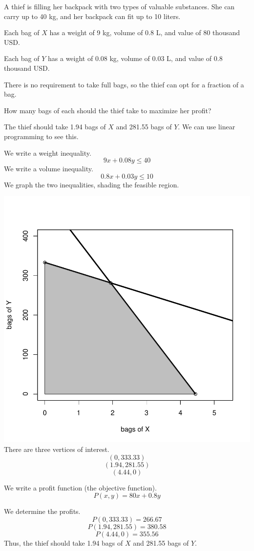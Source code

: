 
\begin{question}
A thief is filling her backpack with two types of valuable substances.
She can carry up to 40 kg, and her backpack can fit up to 10 liters.

Each bag of \(X\) has a weight of 9 kg, volume of 0.8 L, and value of 80
thousand USD.

Each bag of \(Y\) has a weight of 0.08 kg, volume of 0.03 L, and value
of 0.8 thousand USD.

There is no requirement to take full bags, so the thief can opt for a
fraction of a bag.

How many bags of each should the thief take to maximize her profit?
\end{question}

\begin{solution}
The thief should take 1.94 bags of \(X\) and 281.55 bags of \(Y\). We
can use linear programming to see this.

We write a weight inequality. \[9x+0.08y \le 40\] We write a volume
inequality. \[0.8x+0.03y \le 10\] We graph the two inequalities, shading
the feasible region.

\includegraphics{unnamed-chunk-1-1.pdf}\\

There are three vertices of interest. \[(0,333.33) \] \[(1.94,281.55) \]
\[(4.44,0)\]

We write a profit function (the objective function).
\[P(x,y) = 80x+0.8y \]

We determine the profits. \[P(0,333.33)=266.67 \]
\[P(1.94,281.55)=380.58 \] \[P(4.44,0)=355.56 \] Thus, the thief should
take 1.94 bags of \(X\) and 281.55 bags of \(Y\).
\end{solution}

